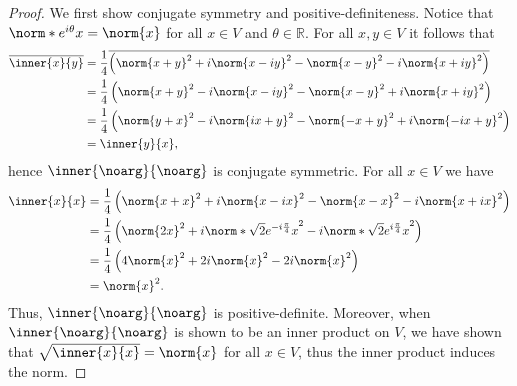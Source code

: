 \begin{proof}
    We first show conjugate symmetry and positive-definiteness. Notice that \(\norm*{e^{i\theta}x} = \norm{x}\) for all \(x \in V\) and \(\theta \in \mathbb{R}\). For all \(x, y \in V\) it follows that
    \begin{align*}
        \conj{\inner{x}{y}} &= \frac14\conj{\left(\norm{x + y}^2 + i \norm{x - iy}^2 - \norm{x - y}^2 - i \norm{x + iy}^2\right)}\\
                            &= \frac14\left(\norm{x + y}^2 - i \norm{x - iy}^2 - \norm{x - y}^2 + i \norm{x + iy}^2\right)\\
                            &= \frac14\left(\norm{y + x}^2 - i \norm{ix + y}^2 - \norm{-x + y}^2 + i \norm{-ix + y}^2\right)\\
                            &= \inner{y}{x},
    \end{align*}
    hence \(\inner{\noarg}{\noarg}\) is conjugate symmetric. For all \(x \in V\) we have
    \begin{align*}
        \inner{x}{x} &= \frac14\left(\norm{x + x}^2 + i \norm{x - ix}^2 - \norm{x - x}^2 - i \norm{x + ix}^2\right)\\
                     &= \frac14\left(\norm{2x}^2 + i \norm*{\sqrt{2}e^{-i\frac{\pi}{4}}x}^2 - i \norm*{\sqrt{2}e^{i\frac{\pi}{4}}x}^2\right)\\
                     &= \frac14\left(4\norm{x}^2 + 2i \norm{x}^2 - 2i\norm{x}^2\right)\\
                     &= \norm{x}^2.
    \end{align*}
    Thus, \(\inner{\noarg}{\noarg}\) is positive-definite. Moreover, when \(\inner{\noarg}{\noarg}\) is shown to be an inner product on \(V\), we have shown that \(\sqrt{\inner{x}{x}} = \norm{x}\) for all \(x \in V\), thus the inner product induces the norm.


\end{proof}
